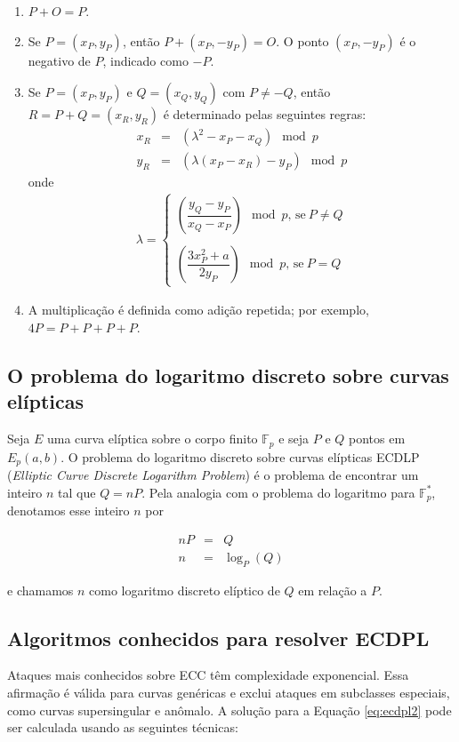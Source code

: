 \begin{enumerate}
  \item $P + O = P$.
  \item Se $P = (x_P, y_P)$, então $P + (x_P, -y_P) = O$. O ponto $(x_P, -y_P)$ é o negativo de \(P\), indicado como \(-P\).
  \item Se $P = (x_P, y_P)$ e $Q = (x_Q, y_Q)$ com $P \neq -Q$, então $R = P + Q = (x_R, y_R)$ é determinado pelas seguintes regras:
    \begin{eqnarray*}
    x_R &=& (\lambda^2 - x_P - x_Q) \mod p \\
    y_R &=& (\lambda(x_P - x_R) - y_P) \mod p
    \end{eqnarray*}
  onde
    \begin{eqnarray*}
    \lambda =
    \begin{cases}
    \left(\dfrac{y_Q - y_P}{x_Q - x_P}\right) \mod p \textrm{, se} \ P \neq Q \\ \\
    \left(\dfrac{3x_P^2 + a}{2y_P}\right) \mod p \textrm{, se} \ P = Q
    \end{cases}
    \end{eqnarray*}
  \item A multiplicação é definida como adição repetida; por exemplo, $4P = P + P + P + P$.
\end{enumerate}

%
%
\subsection{O problema do logaritmo discreto sobre curvas elípticas} \label{ecdpl}
Seja \(E\) uma curva elíptica sobre o corpo finito $\mathbb{F}_p$ e seja \(P\) e \(Q\) pontos em $E_p(a, b)$. O problema do logaritmo discreto sobre curvas elípticas ECDLP (\textit{Elliptic Curve Discrete Logarithm Problem}) é o problema de encontrar um inteiro \(n\) tal que $Q = nP$. Pela analogia com o problema do logaritmo para $\mathbb{F}_p^*$, denotamos esse inteiro \(n\) por

\begin{eqnarray}
nP &=& Q \label{eq:ecdpl1} \\
n &=& \log_P(Q) \label{eq:ecdpl2}
\end{eqnarray}

e chamamos \(n\) como logaritmo discreto elíptico de \(Q\) em relação a \(P\). \cite{Hoffstein:2008}

\subsection{Algoritmos conhecidos para resolver ECDPL}
Ataques mais conhecidos sobre ECC têm complexidade exponencial. Essa afirmação é válida para curvas genéricas e exclui ataques em subclasses especiais, como curvas supersingular e anômalo. A solução para a Equação \ref{eq:ecdpl2} pode ser calculada usando as seguintes técnicas: \cite{Pelzl:2006}

